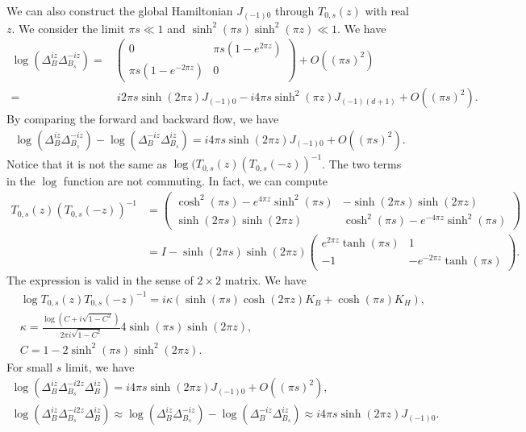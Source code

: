 \documentclass[a4paper,11pt]{article}
\theoremstyle{definition}
\begin{document}
We can also construct the global Hamiltonian $J_{(-1)0}$ through $T_{0,s}(z)$ with real $z$. We consider the limit $\pi s \ll 1$ and $ \sinh^2(\pi s)\sinh^2(\pi z)\ll 1$. We have
\begin{align}
    \log (\Delta_{B}^{iz}\Delta_{B_s}^{-iz}) =& \begin{pmatrix} 0& \pi s(1-e^{2\pi z}) \\ \pi s(1-e^{-2\pi z}) & 0 \end{pmatrix} + O((\pi s)^2) \\
    = &\: i 2 \pi s \sinh(2\pi z) J_{(-1)0} - i 4\pi s \sinh^2(\pi z)J_{(-1)(d+1)} + O((\pi s)^2).
\end{align}
By comparing the forward and backward flow, we have
\begin{align}
    \log (\Delta_{B}^{iz}\Delta_{B_s}^{-iz}) - \log (\Delta_{B}^{-iz}\Delta_{B_s}^{iz}) = i 4 \pi s \sinh(2\pi z) J_{(-1)0} + O((\pi s)^2).
\end{align}
Notice that it is not the same as $\log(T_{0,s}(z)(T_{0,s}(-z))^{-1}$. The two terms in the $\log$ function are not commuting. In fact, we can compute 
\begin{align}
    T_{0,s}(z)(T_{0,s}(-z))^{-1} &= \begin{pmatrix}\cosh^2(\pi s) - e^{4\pi z} \sinh^2(\pi s) & -\sinh(2\pi s)\sinh(2 \pi z) \\ \sinh(2\pi s)\sinh(2 \pi z) & \cosh^2(\pi s) - e^{-4\pi z} \sinh^2(\pi s) 
    \end{pmatrix} \\
    &=I - \sinh(2\pi s)\sinh(2\pi z)\begin{pmatrix}e^{2\pi z} \tanh(\pi s) & 1 \\-1 & -e^{-2\pi z}\tanh(\pi s)\end{pmatrix}.
\end{align}
The expression is valid in the sense of $2\times2$ matrix. We  have
\begin{align}
    &\log T_{0,s}(z)T_{0,s}(-z)^{-1}= i\kappa(\sinh(\pi s) \cosh(2\pi z) K_B + \cosh(\pi s) K_H),\\
    &\kappa = \frac{\log(C+i\sqrt{1-C^2})}{2\pi i\sqrt{1-C^2}} 4\sinh(\pi s) \sinh(2\pi z),\\
    &C = 1 -2 \sinh^2(\pi s)\sinh^2(2\pi z).
\end{align}
For small $s$ limit, we have
\begin{gather}
    \log (\Delta_{B}^{iz}\Delta_{B_s}^{-i2z}\Delta_{B}^{iz})= i 4 \pi s \sinh(2\pi z) J_{(-1)0} + O((\pi s)^2),\\
    \log (\Delta_{B}^{iz}\Delta_{B_s}^{-i2z}\Delta_{B}^{iz}) \approx \log (\Delta_{B}^{iz}\Delta_{B_s}^{-iz}) - \log (\Delta_{B}^{-iz}\Delta_{B_s}^{iz}) \approx i 4 \pi s \sinh(2\pi z) J_{(-1)0}.
\end{gather}
\end{document}

